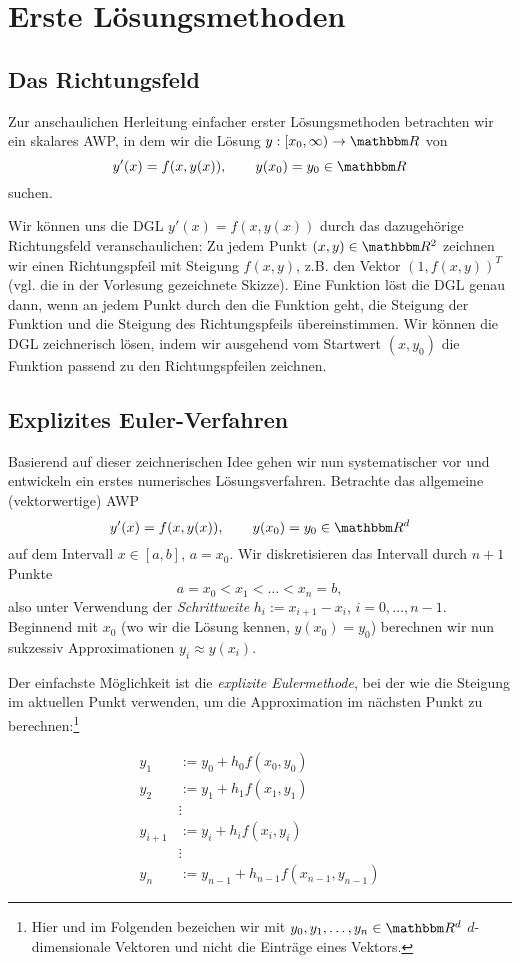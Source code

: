 \documentclass[12pt,a4paper]{book}
\theoremstyle{break}
\theoremstyle{nonumberplain}
\newcommand{\R}{\mathbbm R}
\newcommand{\1}{\mathbbm{1}} 			      	%
\begin{document}
\section{Erste Lösungsmethoden}\label{Sect:NumODE_Motivation}

\subsection{Das Richtungsfeld}

Zur anschaulichen Herleitung einfacher erster Lösungsmethoden betrachten wir ein skalares AWP, 
in dem wir die Lösung $y: [x_0,\infty)\to \R$ von
\[
y'(x)=f(x,y(x)), \qquad y(x_0)=y_0\in \R
\]
suchen.

Wir können uns die DGL $y'(x)=f(x,y(x))$ durch das dazugehörige Richtungsfeld veranschaulichen: Zu jedem Punkt
$(x,y)\in \R^2$ zeichnen wir einen Richtungspfeil mit Steigung $f(x,y)$, z.B. den Vektor $(1,f(x,y))^T$ (vgl. die in der Vorlesung  
gezeichnete Skizze). Eine Funktion löst die DGL genau dann, wenn an jedem
Punkt durch den die Funktion geht, die Steigung der Funktion und die Steigung des Richtungspfeils übereinstimmen.
Wir können die DGL zeichnerisch lösen, indem wir ausgehend vom Startwert $(x,y_0)$ die Funktion passend 
zu den Richtungspfeilen zeichnen.

\subsection{Explizites Euler-Verfahren}

Basierend auf dieser zeichnerischen Idee gehen wir nun systematischer vor und entwickeln ein erstes numerisches Lösungsverfahren.
Betrachte das allgemeine (vektorwertige) AWP
\[
y'(x)=f(x,y(x)), \qquad y(x_0)=y_0\in \R^d
\]
auf dem Intervall $x\in [a,b]$, $a=x_0$. Wir diskretisieren das Intervall durch $n+1$ Punkte
\[
a=x_0 < x_1 < \ldots < x_n=b,
\]
also unter Verwendung der \emph{Schrittweite}
$h_i:=x_{i+1}-x_i$, $i=0,\ldots,n-1$.
Beginnend mit $x_0$ (wo wir die Lösung kennen, $y(x_0)=y_0$) berechnen wir 
nun sukzessiv Approximationen $y_i\approx y(x_i)$. 

Der einfachste Möglichkeit ist die \emph{explizite Eulermethode}, bei der wie die Steigung im aktuellen
Punkt verwenden, um die Approximation im nächsten Punkt zu berechnen:\footnote{Hier und im Folgenden bezeichen wir mit $y_0, y_1,\ldots, y_n\in \R^d$ $d$-dimensionale Vektoren und nicht die Einträge eines Vektors.}

\begin{align*}
y_1 & :=y_0+h_0 f(x_0,y_0)\\
y_2 & :=y_1+h_1 f(x_1,y_1)\\
& \vdots\\
y_{i+1} & :=y_i+h_i f(x_i,y_i)\\
& \vdots\\
y_n & :=y_{n-1}+h_{n-1} f(x_{n-1},y_{n-1})
\end{align*}
\end{document}
